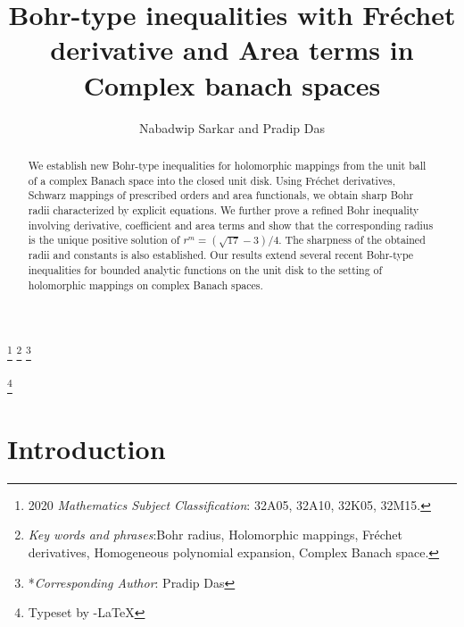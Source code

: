 \documentclass[11pt, reqno]{amsart}
\newtheorem*{cor A}{Corollary A}
\newtheorem*{cor B}{Corollary B}
\numberwithin{equation}{section}
\begin{document}
\title[B\MakeLowercase{ohr-Type Inequalities with} F\MakeLowercase{r\'{e}chet Derivative and} A\MakeLowercase{rea Terms in} C\MakeLowercase{omplex Banach Spaces}]
{B\MakeLowercase{ohr-Type Inequalities with} F\MakeLowercase{r\'{e}chet Derivative and} A\MakeLowercase{rea Terms in} C\MakeLowercase{omplex Banach Spaces}}

\date{}
\author[N. S\MakeLowercase{arkar and} P. D\MakeLowercase{as}]{N\MakeLowercase{abadwip} S\MakeLowercase{arkar and} P\MakeLowercase{radip} D\MakeLowercase{as}}

\address{Amity School of Applied Sciences, Amity University Mumbai, Panvel, Navi Mumbai, Maharashtra-410206, India.}
\address{Department of Mathematics, Raiganj University, Raiganj, West Bengal-733134, India.}

\renewcommand{\thefootnote}{}
\footnote{2020 \emph{Mathematics Subject Classification}: 32A05, 32A10, 32K05, 32M15.}
\footnote{\emph{Key words and phrases}:Bohr radius, Holomorphic mappings, Fr\'{e}chet derivatives, Homogeneous polynomial expansion,
Complex Banach space.}
\footnote{*\emph{Corresponding Author}: Pradip Das}
\renewcommand{\thefootnote}{\arabic{footnote}}
\setcounter{footnote}{0}

\begin{abstract}
We establish new Bohr-type inequalities for holomorphic mappings from the unit ball of a complex Banach space into the closed unit disk. Using Fr\'{e}chet derivatives, Schwarz mappings of prescribed orders and area functionals, we obtain sharp Bohr radii characterized by explicit equations. We further prove a refined Bohr inequality involving derivative, coefficient and area terms and show that the corresponding radius is the unique positive solution of $r^m=(\sqrt{17}-3)/4$. The sharpness of the obtained radii and constants is also established. Our results extend several recent Bohr-type inequalities for bounded analytic functions on the unit disk to the setting of holomorphic mappings on complex Banach spaces.
\end{abstract}

\thanks{Typeset by \AmS -\LaTeX}
\maketitle
\section{{\bf Introduction}}
\end{document}
